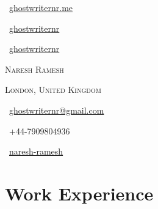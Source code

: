 \documentclass[a4paper,10pt]{extarticle} %
\begin{document}
\renewcommand{\baselinestretch}{1.30}\normalsize

\pagestyle{empty} %

\begin{center}
\begin{minipage}[b]{0.33333\textwidth}
\raggedright
\faGlobe\ {\href{https://ghostwriternr.me/}{ghostwriternr.me}}\par
\faGithub\ {\href{https://github.com/ghostwriternr}{ghostwriternr}}\par
\faGitlab\ {\href{https://gitlab.com/ghostwriternr}{ghostwriternr}}
\end{minipage}%
\begin{minipage}[b]{0.33333\textwidth}
\centering
\Huge\textsc{\textcolor{primary}{Naresh} Ramesh}\par
\large{\textsc{London, United Kingdom}}
\end{minipage}%
\begin{minipage}[b]{0.33333\textwidth}
\raggedleft
\normalsize\faEnvelope\ {\href{mailto:ghostwriternr@gmail.com}{ghostwriternr@gmail.com}}\par
\faPhone\ +44-7909804936\par
\faLinkedinSquare\ {\href{https://www.linkedin.com/in/naresh-ramesh}{naresh-ramesh}}
\phantom{ }
\end{minipage}
\end{center}



\section{\textcolor{primary}{Work Experience}}
\end{document}
